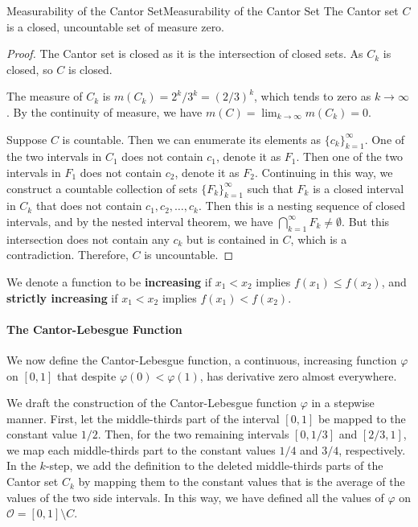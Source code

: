 \documentclass[../main.tex]{subfiles}
\begin{document}
\begin{theorem}{Measurability of the Cantor Set}{Measurability of the Cantor Set}
  The Cantor set $C$ is a closed, uncountable set of measure zero. 
\end{theorem}
\begin{proof}
  The Cantor set is closed as it is the intersection of closed sets. As $C_k$ is closed, so $C$ is closed.

  The measure of $C_k$ is $m(C_k) = 2^k / 3^k = (2/3)^k$, which tends to zero as $k \to \infty$. By the continuity of measure, we have $m(C) = \lim_{k \to \infty} m(C_k) = 0$.

  Suppose $C$ is countable. Then we can enumerate its elements as $\{c_k\}_{k=1}^{\infty}$. One of the two intervals in $C_1$ does not contain $c_1$, denote it as $F_1$. Then one of the two intervals in $F_1$ does not contain $c_2$, denote it as $F_2$. Continuing in this way, we construct a countable collection of sets $\{F_k\}_{k=1}^{\infty}$ such that $F_k$ is a closed interval in $C_k$ that does not contain $c_1, c_2, \ldots, c_k$. Then this is a nesting sequence of closed intervals, and by the nested interval theorem, we have $\bigcap_{k=1}^{\infty} F_k \neq \emptyset$. But this intersection does not contain any $c_k$ but is contained in $C$, which is a contradiction. Therefore, $C$ is uncountable.
\end{proof}

We denote a function to be \textbf{increasing} if $x_1 < x_2$ implies $f(x_1) \leq f(x_2)$, and \textbf{strictly increasing} if $x_1 < x_2$ implies $f(x_1) < f(x_2)$.

\paragraph{The Cantor-Lebesgue Function}
We now define the Cantor-Lebesgue function, a continuous, increasing function $\varphi$ on $[0, 1]$ that despite $\varphi(0) < \varphi(1)$, has derivative zero almost everywhere.

We draft the construction of the Cantor-Lebesgue function $\varphi$ in a stepwise manner. First, let the middle-thirds part of the interval $[0, 1]$ be mapped to the constant value $1/2$. Then, for the two remaining intervals $[0, 1/3]$ and $[2/3, 1]$, we map each middle-thirds part to the constant values $1/4$ and $3/4$, respectively. In the $k$-step, we add the definition to the deleted middle-thirds parts of the Cantor set $C_k$ by mapping them to the constant values that is the average of the values of the two side intervals. In this way, we have defined all the values of $\varphi$ on $\mathcal{O} = [0, 1] \setminus C$.
\end{document}

